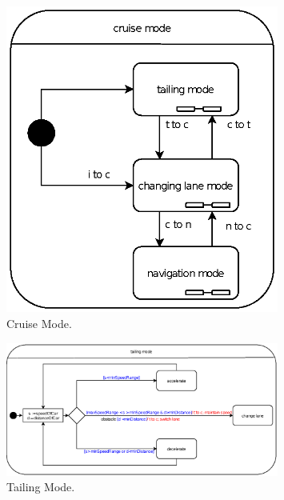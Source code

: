 \documentclass[12pt]{article}
\begin{document}
\begin{spacing}{1.5}
\begin{figure}[h!]
	\centering
		\includegraphics[width=0.8\textwidth]{./A2_Figures/A2_SOEN331_Cruise.eps}
		  \caption{Cruise Mode.}
  \label{fig:cruise-mode-fig}
\end{figure}

\begin{figure}[h!]
	\centering
		\includegraphics[width=0.8\textwidth]{./A2_Figures/A2_SOEN331_Tailing.eps}
		  \caption{Tailing Mode.}
  \label{fig:tailing-mode-fig}
\end{figure}


\end{spacing}
\end{document}
